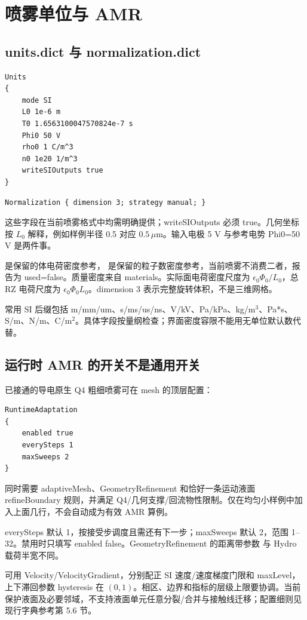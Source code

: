 \documentclass[a4paper,11pt]{article}
\begin{document}
\section{喷雾单位与 AMR}
\subsection{units.dict 与 normalization.dict}
\begin{lstlisting}
Units
{
    mode SI
    L0 1e-6 m
    T0 1.6563100047570824e-7 s
    Phi0 50 V
    rho0 1 C/m^3
    n0 1e20 1/m^3
    writeSIOutputs true
}
\end{lstlisting}
\begin{lstlisting}
Normalization { dimension 3; strategy manual; }
\end{lstlisting}
这些字段在当前喷雾格式中均需明确提供；writeSIOutputs 必须 true。几何坐标按 $L_0$ 解释，例如样例半径 0.5 对应 $0.5\,\mu$m。输入电极 5 V 与参考电势 Phi0=50 V 是两件事。

 是保留的体电荷密度参考， 是保留的粒子数密度参考，当前喷雾不消费二者，报告为 used=false。质量密度来自 materials。实际面电荷密度尺度为 $\epsilon_0\Phi_0/L_0$，总 RZ 电荷尺度为 $\epsilon_0\Phi_0L_0$。dimension 3 表示完整旋转体积，不是三维网格。

常用 SI 后缀包括 m/mm/um、s/ms/us/ns、V/kV、Pa/kPa、kg/m$^3$、Pa*s、S/m、N/m、C/m$^2$。具体字段按量纲检查；界面密度容限不能用无单位默认数代替。

\subsection{运行时 AMR 的开关不是通用开关}
已接通的导电原生 Q4 粗细喷雾可在 mesh 的顶层配置：
\begin{lstlisting}
RuntimeAdaptation
{
    enabled true
    everySteps 1
    maxSweeps 2
}
\end{lstlisting}
同时需要 adaptiveMesh、GeometryRefinement 和恰好一条运动液面 refineBoundary 规则，并满足 Q4/几何支撑/回流物性限制。仅在均匀小样例中加入上面几行，不会自动成为有效 AMR 算例。

everySteps 默认 1，按接受步调度且需还有下一步；maxSweeps 默认 2，范围 1--32。禁用时只填写 enabled false。GeometryRefinement 的距离带参数  与 Hydro 载荷半宽不同。

 可用 Velocity/VelocityGradient，分别配正 SI 速度/速度梯度门限和 maxLevel，上下滞回参数 hysteresis 在 $(0,1)$。相区、边界和指标的层级上限要协调。当前保护液面及必要邻域，不支持液面单元任意分裂/合并与接触线迁移；配置细则见现行字典参考第 5.6 节。
\end{document}
